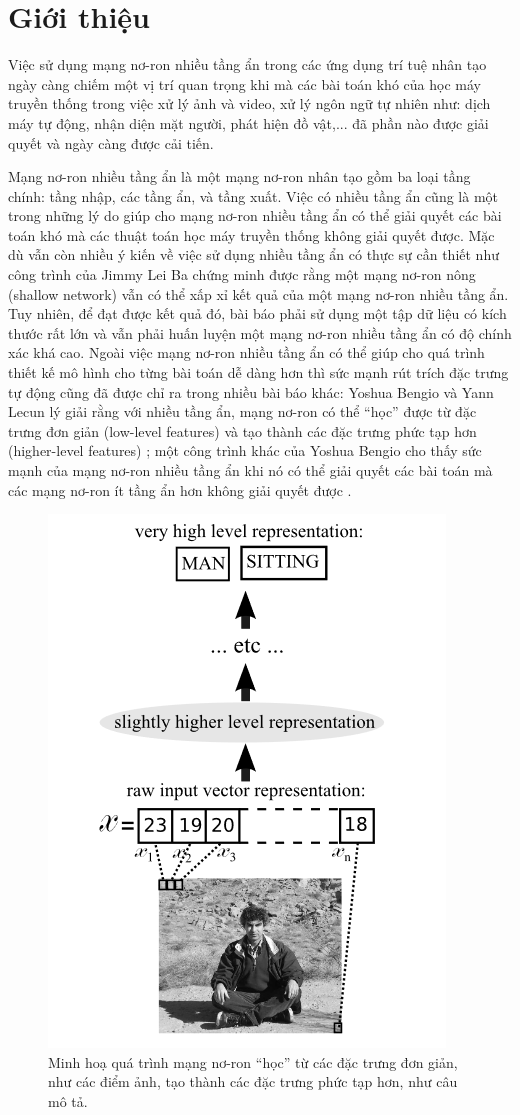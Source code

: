 \chapter{Giới thiệu}
\label{Chapter1}

Việc sử dụng mạng nơ-ron nhiều tầng ẩn trong các ứng dụng trí tuệ nhân tạo ngày càng chiếm một vị trí quan trọng khi mà các bài toán khó của học máy truyền thống trong việc xử lý ảnh và video, xử lý ngôn ngữ tự nhiên như: dịch máy tự động, nhận diện mặt người, phát hiện đồ vật,... đã phần nào được giải quyết và ngày càng được cải tiến.

Mạng nơ-ron nhiều tầng ẩn là một mạng nơ-ron nhân tạo gồm ba loại tầng chính: tầng nhập, các tầng ẩn, và tầng xuất. Việc có nhiều tầng ẩn cũng là một trong những lý do giúp cho mạng nơ-ron nhiều tầng ẩn có thể giải quyết các bài toán khó mà các thuật toán học máy truyền thống không giải quyết được. Mặc dù vẫn còn nhiều ý kiến về việc sử dụng nhiều tầng ẩn có thực sự cần thiết như công trình của Jimmy Lei Ba \cite{ba2013dodeepnets} chứng minh được rằng một mạng nơ-ron nông (shallow network) vẫn có thể xấp xỉ kết quả của một mạng nơ-ron nhiều tầng ẩn. Tuy nhiên, để đạt được kết quả đó, bài báo phải sử dụng một tập dữ liệu có kích thước rất lớn và vẫn phải huấn luyện một mạng nơ-ron nhiều tầng ẩn có độ chính xác khá cao. Ngoài việc mạng nơ-ron nhiều tầng ẩn có thể giúp cho quá trình thiết kế mô hình cho từng bài toán dễ dàng hơn \cite{nielsen2015neural} thì sức mạnh rút trích đặc trưng tự động cũng đã được chỉ ra trong nhiều bài báo khác: Yoshua Bengio và Yann Lecun lý giải rằng với nhiều tầng ẩn, mạng nơ-ron có thể ``học'' được từ đặc trưng đơn giản (low-level features) và tạo thành các đặc trưng phức tạp hơn (higher-level features) \cite{bengio2007scaling}; một công trình khác của Yoshua Bengio cho thấy sức mạnh của mạng nơ-ron nhiều tầng ẩn khi nó có thể giải quyết các bài toán mà các mạng nơ-ron ít tầng ẩn hơn không giải quyết được \cite{bengio2009learning}.

\begin{figure}[htp]
\centering
\includegraphics[width=65 mm]{images/layers-features.png}
\caption{Minh hoạ quá trình mạng nơ-ron ``học'' từ các đặc trưng đơn giản, như các điểm ảnh, tạo thành các đặc trưng phức tạp hơn, như câu mô tả. \cite{bengio2009learning}}
\label{fig:layers-features}
\end{figure}

